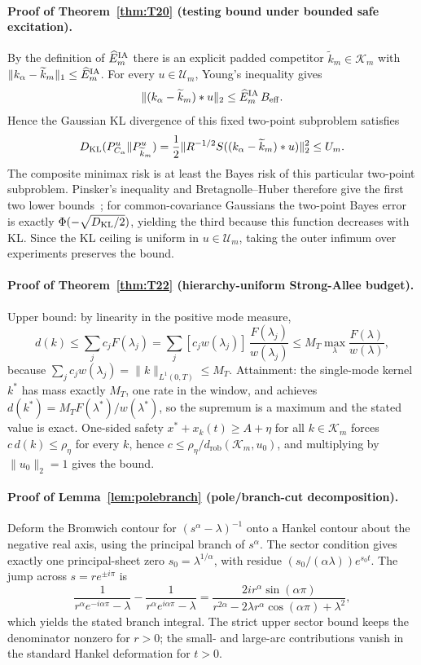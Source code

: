 \paragraph{Proof of Theorem~\ref{thm:T20} (testing bound under bounded safe excitation).}
By the definition of $\widehat E_m^{\rm IA}$ there is an explicit padded competitor $\widetilde k_m\in\mathcal K_m$ with $\|k_\alpha-\widetilde k_m\|_1\le\widehat E_m^{\rm IA}$.  For every $u\in\mathcal U_m$, Young's inequality gives
\[
\|(k_\alpha-\widetilde k_m)*u\|_2
\le \widehat E_m^{\rm IA}\,B_{\mathrm{eff}}.
\]
Hence the Gaussian KL divergence of this fixed two-point subproblem satisfies
\[
D_{\rm KL}(P_{C_\alpha}^u\|P_{\widetilde k_m}^u)
=\frac12\|R^{-1/2}S((k_\alpha-\widetilde k_m)*u)\|_2^2
\le U_m.
\]
The composite minimax risk is at least the Bayes risk of this particular two-point subproblem.  Pinsker's inequality and Bretagnolle--Huber therefore give the first two lower bounds~\cite{T01}; for common-covariance Gaussians the two-point Bayes error is exactly $\Phi(-\sqrt{D_{\rm KL}/2})$, yielding the third because this function decreases with KL.  Since the KL ceiling is uniform in $u\in\mathcal U_m$, taking the outer infimum over experiments preserves the bound.

\paragraph{Proof of Theorem~\ref{thm:T22} (hierarchy-uniform Strong-Allee budget).}
Upper bound: by linearity in the positive mode measure,
\[
d(k)\le\sum_j c_j F(\lambda_j)=\sum_j[c_j w(\lambda_j)]\,\frac{F(\lambda_j)}{w(\lambda_j)}
\le M_T\max_{\lambda}\frac{F(\lambda)}{w(\lambda)},
\]
because $\sum_j c_j w(\lambda_j)=\|k\|_{L^1(0,T)}\le M_T$.  Attainment: the single-mode kernel $k^*$ has mass exactly $M_T$, one rate in the window, and achieves $d(k^*)=M_T F(\lambda^*)/w(\lambda^*)$, so the supremum is a maximum and the stated value is exact.  One-sided safety $x^*+x_k(t)\ge A+\eta$ for all $k\in\mathcal K_m$ forces $c\,d(k)\le\rho_\eta$ for every $k$, hence $c\le\rho_\eta/d_{\mathrm{rob}}(\mathcal K_m,u_0)$, and multiplying by $\|u_0\|_2=1$ gives the bound.

\paragraph{Proof of Lemma~\ref{lem:polebranch} (pole/branch-cut decomposition).}
Deform the Bromwich contour for $(s^\alpha-\lambda)^{-1}$ onto a Hankel contour about the negative real axis, using the principal branch of $s^\alpha$. The sector condition gives exactly one principal-sheet zero $s_0=\lambda^{1/\alpha}$, with residue $(s_0/(\alpha\lambda))e^{s_0t}$. The jump across $s=re^{\pm i\pi}$ is
\[
\frac{1}{r^\alpha e^{-i\alpha\pi}-\lambda}-\frac{1}{r^\alpha e^{i\alpha\pi}-\lambda}
=\frac{2ir^\alpha\sin(\alpha\pi)}{r^{2\alpha}-2\lambda r^\alpha\cos(\alpha\pi)+\lambda^2},
\]
which yields the stated branch integral. The strict upper sector bound keeps the denominator nonzero for $r>0$; the small- and large-arc contributions vanish in the standard Hankel deformation for $t>0$.